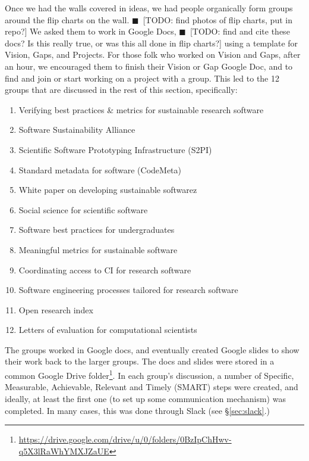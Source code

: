 \documentclass[11pt, oneside]{amsart}
\newcommand{\todo}[1]{{\color{blue}$\blacksquare$~\textsf{[TODO: #1]}}}
\begin{document}
Once we had the walls covered in ideas, we had people organically form groups around the flip charts on the wall. \todo{find photos of flip charts, put in repo?} We asked them to work in Google Docs, \todo{find and cite these docs?  Is this really true, or was this all done in flip charts?} using a template for Vision, Gaps, and Projects.  For those folk who worked on Vision and Gaps, after an hour, we encouraged them to finish their Vision or Gap Google Doc, and to find and join or start working on a project with a group. This led to the 12 groups that are discussed in the rest of this section, specifically:
\begin{enumerate}
\item Verifying best practices \& metrics for sustainable research software
\item Software Sustainability Alliance
\item Scientific Software Prototyping Infrastructure (S2PI)
\item Standard metadata for software (CodeMeta)
\item White paper on developing sustainable softwarez
\item Social science for scientific software
\item Software best practices for undergraduates
\item Meaningful metrics for sustainable software
\item Coordinating access to CI for research software
\item Software engineering processes tailored for research software
\item Open research index
\item Letters of evaluation for computational scientists
\end{enumerate}


The groups worked in Google docs, and eventually created Google slides to show their work back to the larger groups. The docs and slides were stored in a common Google Drive folder\footnote{\url{https://drive.google.com/drive/u/0/folders/0BzIpChHwv-q5X3lRaWhYMXJZaUE}}. In each group's discussion, a number of Specific, Measurable, Achievable, Relevant and Timely (SMART) steps were created, and ideally, at least the first one (to set up some communication mechanism) was completed.  In many cases, this was done through Slack (see \S\ref{sec:slack}.)















\end{document}
